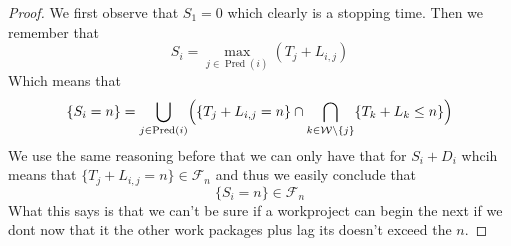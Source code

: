 \documentclass[11pt,a4paper]{article}
\newcommand{\cF}{\mathcal{F}}
\newcommand{\1}{\mathbf{1}}
\newcommand{\Pred}{\operatorname{Pred}}
\theoremstyle{definition}
\theoremstyle{plain}
\theoremstyle{remark}
\numberwithin{equation}{section}
\begin{document}
\begin{proof}
    We first observe that $S_1=0$ which clearly is a stopping time. Then we remember that
    \[
    S_i=\max_{j\in \Pred(i)}(T_j+L_{i,j})
    \]
    Which means that
    \[
    \{S_i=n\} = \bigcup_{j\in \Pred(i)}\Bigl( \{T_j+L_{i,j} = n\} \cap\bigcap_{k\in\mathcal{W}\setminus \{j\}} \{T_k+L_k \leq  n\} \Bigr )
    \]
    We use the same reasoning before that we can only have that for $S_i+D_i$ whcih means that $\{T_j+L_{i,j} = n\} \in \cF_n$ and thus we easily conclude that 
    \[
    \{S_i=n\} \in  \cF_n
    \]
    What this says is that we can't be sure if a workproject can begin the next if we dont now that it the other work packages plus lag its doesn't exceed the $n$. 
\end{proof}
\end{document}
